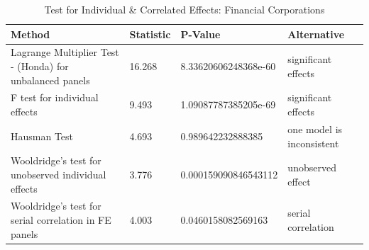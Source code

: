\begin{table}[ht]
\centering
\caption{ Test for Individual & Correlated Effects: Financial Corporations} 
\begingroup\small
\begin{tabular}{llll}
  \toprule
Method & Statistic & P-Value & Alternative \\ 
  \midrule
Lagrange Multiplier Test -  (Honda) for unbalanced panels & 16.268 & 8.33620606248368e-60 & significant effects \\ 
  F test for individual effects & 9.493 & 1.09087787385205e-69 & significant effects \\ 
  Hausman Test & 4.693 & 0.989642232888385 & one model is inconsistent \\ 
  Wooldridge's test for unobserved individual effects & 3.776 & 0.000159090846543112 & unobserved effect \\ 
  Wooldridge's test for serial correlation in FE panels & 4.003 & 0.0460158082569163 & serial correlation \\ 
   \bottomrule
\end{tabular}
\endgroup
\end{table}
